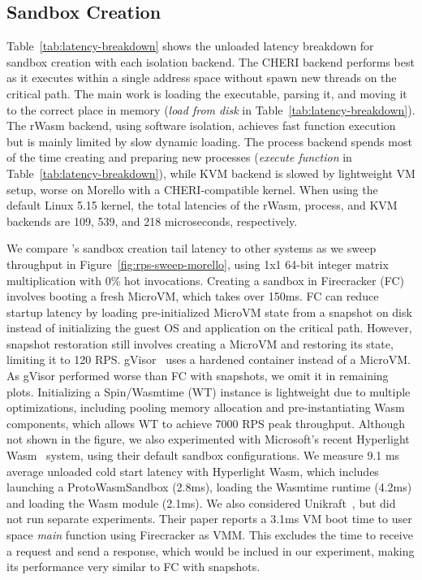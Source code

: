 \subsection{Sandbox Creation}\label{sec:eval:sandbox-creation}

Table~\ref{tab:latency-breakdown} shows the unloaded latency breakdown for \dandelion sandbox creation with each isolation backend. The CHERI backend performs best as it executes within a single address space without spawn new threads on the critical path. The main work is loading the executable, parsing it, and moving it to the correct place in memory (\textit{load from disk} in Table~\ref{tab:latency-breakdown}).
The rWasm backend, using software isolation, achieves fast function execution but is mainly limited by slow dynamic loading. %
The process backend spends most of the time creating and preparing new processes (\textit{execute function} in Table~\ref{tab:latency-breakdown}), while KVM backend is slowed by lightweight VM setup, worse on Morello with a CHERI-compatible kernel.
When using the default Linux 5.15 kernel, the total latencies of the rWasm, process, and KVM backends are 109, 539, and 218 microseconds, respectively.

We compare \dandelion's sandbox creation tail latency to other systems as we sweep throughput in Figure~\ref{fig:rps-sweep-morello}, using 1x1 64-bit integer matrix multiplication with 0\% hot invocations. Creating a sandbox in Firecracker (FC) involves booting a fresh MicroVM, which takes over 150ms. FC can reduce startup latency by loading pre-initialized MicroVM state from a snapshot on disk instead of initializing the guest OS and application on the critical path. However, snapshot restoration still involves creating a MicroVM and restoring its state, limiting it to 120 RPS.
gVisor~\cite{gvisor} uses a hardened container instead of a MicroVM. 
As gVisor performed worse than FC with snapshots, we omit it in remaining plots.
Initializing a Spin/Wasmtime (WT) instance is lightweight due to multiple optimizations, including pooling memory allocation and pre-instantiating Wasm components, which allows WT to achieve 7000 RPS peak throughput.
Although not shown in the figure, we also experimented with Microsoft's recent Hyperlight Wasm~\cite{hyperlight-wasm} system, using their default sandbox configurations.
We measure 9.1 ms average unloaded cold start latency with Hyperlight Wasm, which includes launching a ProtoWasmSandbox (2.8ms), loading the Wasmtime runtime (4.2ms) and loading the Wasm module (2.1ms).
We also considered Unikraft~\cite{unikraft}, but did not run separate experiments. Their paper reports a 3.1ms VM boot time to user space \textit{main} function using Firecracker as VMM.
This excludes the time to receive a request and send a response, which would be inclued in our experiment, making its performance very similar to FC with snapshots.

